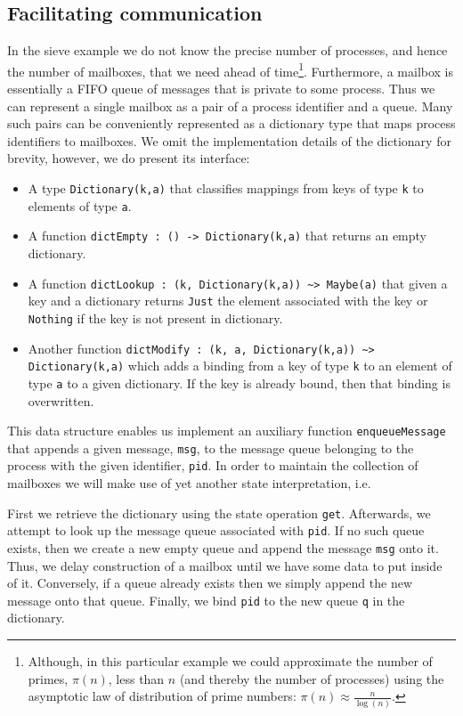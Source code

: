 \documentclass[12pt,mscres,cdtppar,twoside,openright,logo,rightchapter,normalheadings]{infthesis}
\newcommand{\snippet}[1]{}
\theoremstyle{definition}
\begin{document}
\subsection{Facilitating communication}

In the sieve example we do not know the precise number of processes,
and hence the number of mailboxes, that we need ahead of
time\footnote{Although, in this particular example we could
  approximate the number of primes, $\pi(n)$, less than $n$ (and
  thereby the number of processes) using the asymptotic law of
  distribution of prime numbers: $\pi(n) \approx
  \frac{n}{\log(n)}$.}. Furthermore, a mailbox is essentially a FIFO
queue of messages that is private to some process. Thus we can
represent a single mailbox as a pair of a process identifier and a
queue. Many such pairs can be conveniently represented as a dictionary
type that maps process identifiers to mailboxes. We omit the
implementation details of the dictionary for brevity, however, we do
present its interface:
\begin{itemize}
\item A type \lstinline$Dictionary(k,a)$ that classifies mappings from
  keys of type \lstinline$k$ to elements of type \lstinline$a$.
\item A function \lstinline$dictEmpty : () -> Dictionary(k,a)$ that
  returns an empty dictionary.
\item A function
  \lstinline$dictLookup : (k, Dictionary(k,a)) ~> Maybe(a)$ that given
  a key and a dictionary returns \lstinline$Just$ the element
  associated with the key or \lstinline$Nothing$ if the key is not
  present in dictionary.
\item Another function
  \lstinline$dictModify : (k, a, Dictionary(k,a)) ~> Dictionary(k,a)$
  which adds a binding from a key of type \lstinline$k$ to an element
  of type \lstinline$a$ to a given dictionary. If the key is already
  bound, then that binding is overwritten.
\end{itemize}
This data structure enables us implement an auxiliary function
\lstinline$enqueueMessage$ that appends a given message,
\lstinline$msg$, to the message queue belonging to the process with
the given identifier, \lstinline$pid$. In order to maintain the
collection of mailboxes we will make use of yet another state
interpretation, i.e.
%
\snippet{enqueueMessage.links}
%
First we retrieve the dictionary using the state operation
\lstinline$get$. Afterwards, we attempt to look up the message queue
associated with \lstinline$pid$. If no such queue exists, then we
create a new empty queue and append the message \lstinline$msg$ onto
it. Thus, we delay construction of a mailbox until we have some data
to put inside of it. 
%
Conversely, if a queue already exists then we simply append the new
message onto that queue. Finally, we bind \lstinline$pid$ to the new
queue \lstinline$q$ in the dictionary.
\end{document}
